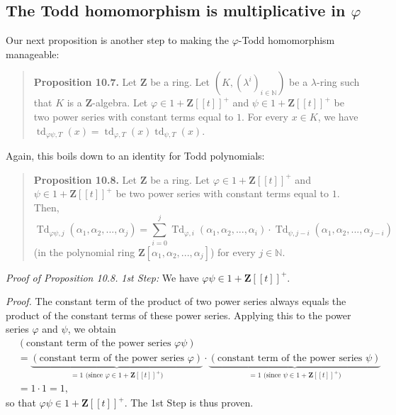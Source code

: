 \documentclass[numbers=enddot,12pt,final,onecolumn,notitlepage]{scrartcl}%
\begin{document}
\subsection{The Todd homomorphism is multiplicative in $\varphi$}

Our next proposition is another step to making the $\varphi$-Todd homomorphism manageable:

\begin{quote}
\textbf{Proposition 10.7.} Let $\mathbf{Z}$ be a ring. Let $\left(  K,\left(
\lambda^{i}\right)  _{i\in\mathbb{N}}\right)  $ be a $\lambda$-ring such that
$K$ is a $\mathbf{Z}$-algebra. Let $\varphi\in1+\mathbf{Z}\left[  \left[
t\right]  \right]  ^{+}$ and $\psi\in1+\mathbf{Z}\left[  \left[  t\right]
\right]  ^{+}$ be two power series with constant terms equal to $1$. For every
$x\in K$, we have $\operatorname*{td}\nolimits_{\varphi\psi,T}\left(
x\right)  =\operatorname*{td}\nolimits_{\varphi,T}\left(  x\right)
\operatorname*{td}\nolimits_{\psi,T}\left(  x\right)  $.
\end{quote}

Again, this boils down to an identity for Todd polynomials:

\begin{quote}
\textbf{Proposition 10.8.} Let $\mathbf{Z}$ be a ring. Let $\varphi
\in1+\mathbf{Z}\left[  \left[  t\right]  \right]  ^{+}$ and $\psi
\in1+\mathbf{Z}\left[  \left[  t\right]  \right]  ^{+}$ be two power series
with constant terms equal to $1$. Then,%
\[
\operatorname*{Td}\nolimits_{\varphi\psi,j}\left(  \alpha_{1},\alpha
_{2},...,\alpha_{j}\right)  =\sum\limits_{i=0}^{j}\operatorname*{Td}%
\nolimits_{\varphi,i}\left(  \alpha_{1},\alpha_{2},...,\alpha_{i}\right)
\cdot\operatorname*{Td}\nolimits_{\psi,j-i}\left(  \alpha_{1},\alpha
_{2},...,\alpha_{j-i}\right)
\]
(in the polynomial ring $\mathbf{Z}\left[  \alpha_{1},\alpha_{2}%
,...,\alpha_{j}\right]  $) for every $j\in\mathbb{N}$.
\end{quote}

\textit{Proof of Proposition 10.8.} \textit{1st Step:} We have $\varphi\psi
\in1+\mathbf{Z}\left[  \left[  t\right]  \right]  ^{+}$.

\textit{Proof.} The constant term of the product of two power series always
equals the product of the constant terms of these power series. Applying this
to the power series $\varphi$ and $\psi$, we obtain%
\begin{align*}
&  \left(  \text{constant term of the power series }\varphi\psi\right) \\
&  =\underbrace{\left(  \text{constant term of the power series }%
\varphi\right)  }_{=1\text{ (since }\varphi\in1+\mathbf{Z}\left[  \left[
t\right]  \right]  ^{+}\text{)}}\cdot\underbrace{\left(  \text{constant term
of the power series }\psi\right)  }_{=1\text{ (since }\psi\in1+\mathbf{Z}%
\left[  \left[  t\right]  \right]  ^{+}\text{)}}\\
&  =1\cdot1=1,
\end{align*}
so that $\varphi\psi\in1+\mathbf{Z}\left[  \left[  t\right]  \right]  ^{+}$.
The 1st Step is thus proven.
\end{document}
